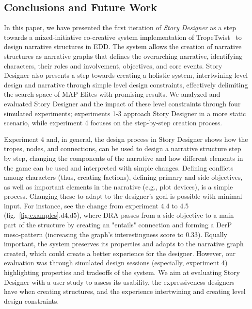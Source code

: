 \subsection{Conclusions and Future Work}


In this paper, we have presented the first iteration of \emph{Story Designer} as a step towards a mixed-initiative co-creative system implementation of TropeTwist~ to design narrative structures in EDD. The system allows the creation of narrative structures as narrative graphs that defines the overarching narrative, identifying characters, their roles and involvement, objectives, and core events. Story Designer also presents a step towards creating a holistic system, intertwining level design and narrative through simple level design constraints, effectively delimiting the search space of MAP-Elites with promising results. We analyzed and evaluated Story Designer and the impact of these level constraints through four simulated experiments; experiments 1-3 approach Story Designer in a more static scenario, while experiment 4 focuses on the step-by-step creation process.

Experiment 4 and, in general, the design process in Story Designer shows how the tropes, nodes, and connections, can be used to design a narrative structure step by step, changing the components of the narrative and how different elements in the game can be used and interpreted with simple changes. Defining conflicts among characters (thus, creating factions), defining primary and side objectives, as well as important elements in the narrative (e.g., plot devices), is a simple process. Changing these to adapt to the designer's goal is possible with minimal input. For instance, see the change from experiment 4.4 to 4.5 (fig.~\ref{fig:examples}.d4,d5), where DRA passes from a side objective to a main part of the structure by creating an "entails" connection and forming a DerP meso-pattern (increasing the graph's interestingness score to 0.33). Equally important, the system preserves its properties and adapts to the narrative graph created, which could create a better experience for the designer. However, our evaluation was through simulated design sessions (especially, experiment 4) highlighting properties and tradeoffs of the system. We aim at evaluating Story Designer with a user study to assess its usability, the expressiveness designers have when creating structures, and the experience intertwining and creating level design constraints. 

